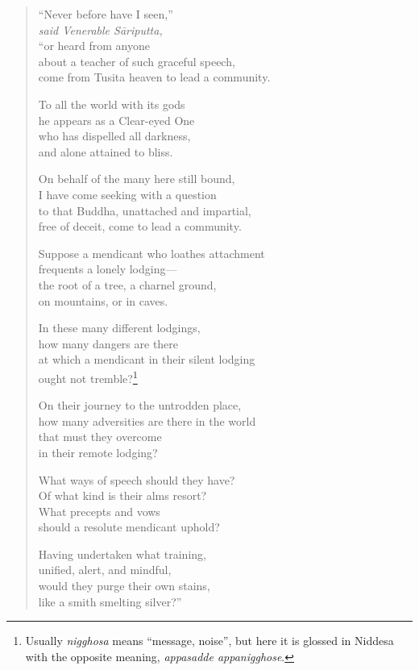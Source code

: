 \documentclass[12pt,openany]{book}%
\newcommand*{\scspeaker}[1]{\hspace{2em}\textit{#1}}
\begin{document}
\begin{verse}%
“Never before have I seen,” \\
\scspeaker{said Venerable \textsanskrit{Sāriputta}, }\\
“or heard from anyone \\
about a teacher of such graceful speech, \\
come from Tusita heaven to lead a community. 

To all the world with its gods \\
he appears as a Clear-eyed One \\
who has dispelled all darkness, \\
and alone attained to bliss. 

On behalf of the many here still bound, \\
I have come seeking with a question \\
to that Buddha, unattached and impartial, \\
free of deceit, come to lead a community. 

Suppose a mendicant who loathes attachment \\
frequents a lonely lodging—\\
the root of a tree, a charnel ground, \\
on mountains, or in caves. 

In these many different lodgings, \\
how many dangers are there \\
at which a mendicant in their silent lodging \\
ought not tremble?\footnote{Usually \textit{nigghosa} means “message, noise”, but here it is glossed in Niddesa with the opposite meaning, \textit{appasadde appanigghose}. } 

On their journey to the untrodden place, \\
how many adversities are there in the world \\
that must they overcome \\
in their remote lodging? 

What ways of speech should they have? \\
Of what kind is their alms resort? \\
What precepts and vows \\
should a resolute mendicant uphold? 

Having undertaken what training, \\
unified, alert, and mindful, \\
would they purge their own stains, \\
like a smith smelting silver?” 


\end{verse}
\end{document}
